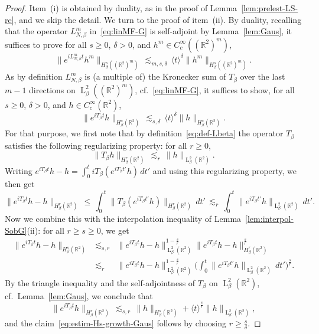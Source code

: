 \documentclass[a4paper,11pt,reqno,noindent]{amsart}
\theoremstyle{plain}
\numberwithin{equation}{section}
\newcommand{\R}{\mathbb R}
\newcommand{\3}{|\!|\!|}
\newcommand{\Ld}{\operatorname{L}}
\begin{document}
\begin{proof}
Item~(i) is obtained by duality, as in the proof of Lemma~\ref{lem:prelest-LS-re}, and we skip the detail. 
We turn to the proof of item~(ii). By duality, recalling that the operator $L_{N,\beta}^m$ in~\eqref{eq:linMF-G} is self-adjoint by Lemma~\ref{lem:Gaus}, it suffices to prove for all $s\ge0$, $\delta>0$, and $h^m\in C^\infty_c((\R^2)^m)$,
\begin{equation*}
\|e^{iL_{N,\beta}^mt}h^m\|_{H_\beta^s((\R^2)^m)}\,\lesssim_{m,s,\delta}\,\langle t\rangle^{\delta}\|h^m\|_{H^s_\beta((\R^2)^m)}.
\end{equation*}
As by definition $L_{N,\beta}^m$ is (a multiple of) the Kronecker sum of $T_\beta$ over the last $m-1$ directions on $\Ld^2_\beta((\R^2)^m)$, cf.~\eqref{eq:linMF-G}, it suffices to show, for all $s\ge0$, $\delta>0$, and $h\in C^\infty_c(\R^2)$,
\begin{equation}\label{eq:estim-Hs-growth-Gaus}
\|e^{iT_\beta t}h\|_{H_\beta^s(\R^2)}\,\lesssim_{s,\delta}\,\langle t\rangle^\delta\|h\|_{H^s_\beta(\R^2)}.
\end{equation}
For that purpose, we first note that by definition~\eqref{eq:def-Lbeta} the operator $T_\beta$ satisfies the following regularizing property: for all $r\ge0$,
\[\|T_\beta h\|_{H^r_\beta(\R^2)}\,\lesssim_r\,\|h\|_{\Ld^2_\beta(\R^2)}.\]
Writing $e^{iT_\beta t}h-h=\int_0^tiT_\beta(e^{iT_\beta t'}h)\,dt'$ and using this regularizing property, we then get
\[\|e^{iT_\beta t}h-h\|_{H^r_\beta(\R^2)}\,\le\,\int_0^t\|T_\beta(e^{iT_\beta t'}h)\|_{H^r_\beta(\R^2)}\,dt'\,\lesssim_r\,\int_0^t\|e^{iT_\beta t'}h\|_{\Ld^2_\beta(\R^2)}\,dt'.\]
Now we combine this with the interpolation inequality of Lemma~\ref{lem:interpol-SobG}(ii): for all $r\ge s\ge0$, we get
\begin{eqnarray*}
\|e^{iT_\beta t}h-h\|_{H_\beta^s(\R^2)}&\lesssim_{s,r}&\|e^{iT_\beta t}h-h\|_{\Ld^2_\beta(\R^2)}^{1-\frac sr}\|e^{iT_\beta t}h-h\|_{H_\beta^r(\R^2)}^\frac sr\\
&\lesssim_{r}&\|e^{iT_\beta t}h-h\|_{\Ld^2_\beta(\R^2)}^{1-\frac sr}\Big(\int_0^t\|e^{iT_\beta t'}h\|_{\Ld^2_\beta(\R^2)}\,dt'\Big)^\frac sr.
\end{eqnarray*}
By the triangle inequality and the self-adjointness of $T_\beta$ on $\Ld^2_\beta(\R^2)$, cf.~Lemma~\ref{lem:Gaus}, we conclude that
\begin{equation*}
\|e^{iT_\beta t}h\|_{H_\beta^s(\R^2)}\,\lesssim_{s,r}\,\|h\|_{H_\beta^s(\R^2)}+\langle t\rangle^\frac sr\|h\|_{\Ld^2_\beta(\R^2)},
\end{equation*}
and the claim~\eqref{eq:estim-Hs-growth-Gaus} follows by choosing $r\ge \frac s\delta$.
\end{proof}
\end{document}
